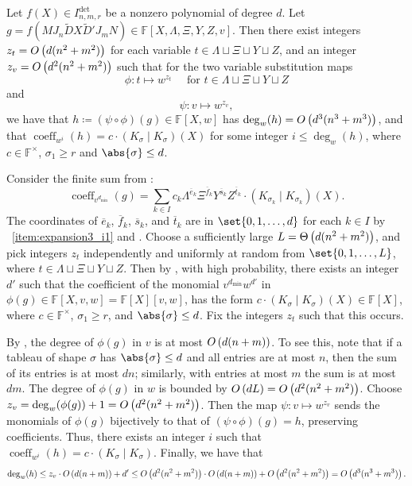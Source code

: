 \documentclass[10pt,a4paper]{amsart}
\DeclareMathOperator{\coeff}{coeff}
\newcommand*\F{\mathbb{F}}
\newcommand*\defeq{\coloneqq}
\newcommand*\bigO[1]{%
    O\kern-0.0pt\left(#1\right)
}
\newcommand*\bigTheta[1]{%
    \Theta\kern-0.0pt\left(#1\right)
}
\begin{document}
\begin{lem}\label{lem:univariate}
Let $f(X) \in I^{\det}_{n, m, r}$ 
be a nonzero polynomial of degree $d$.
Let $g=f(M J_n \widetilde{D} X \widetilde{D}' J_m N) \in \F[X, \Lambda, \Xi, Y, Z, v]$.
Then there exist integers $z_t = \bigO{d(n^2+m^2)}$ for each variable $t\in \Lambda\sqcup\Xi\sqcup Y\sqcup Z$, and an integer $z_v = \bigO{d^2(n^2+m^2)}$ such that for the two variable substitution maps 
\[
    \phi\colon t \mapsto w^{z_t} \quad\text{ for } t\in \Lambda \sqcup \Xi \sqcup Y \sqcup Z
\]
and
\[
    \psi\colon v \mapsto w^{z_v},
\]
we have that $h \defeq (\psi\circ\phi)(g)\in\F[X,w]$ has $\deg_w(h) = \bigO{d^3(n^3+m^3)}$, and that $\coeff_{w^i}(h) = c\cdot (K_\sigma\mid K_\sigma)(X)$ for some integer $i\leq \deg_w(h)$, where $c\in\F^\times$, $\sigma_1\geq r$ and $\abs{\sigma} \leq d$.
\end{lem}
\begin{pf}
Consider the finite sum from :
\[
\coeff_{v^{d_{\min}}}(g)=\sum_{k\in I} c_k \Lambda^{\overline{e}_k}\Xi^{\overline{f}_k}Y^{\overline{s}_k}Z^{\overline{t}_k}\cdot (K_{\sigma_k}\mid K_{\sigma_k})(X).
\]
The coordinates of $\overline{e}_k$, $\overline{f}_k$, $\overline{s}_k$, and $\overline{t}_k$ are in $\set{0,1,\dots,d}$ for each $k \in I$ by ~\eqref{item:expansion3_i1} and .
Choose a sufficiently large $L=\bigTheta{d(n^2+m^2)}$, and pick integers $z_t$ independently and uniformly at random from $ \set{0, 1, \ldots, L}$, where $t\in \Lambda\sqcup\Xi\sqcup Y\sqcup Z$.
Then by , with high probability, there exists an integer $d'$ such that the coefficient of the monomial $v^{d_{\min}}w^{d'}$ in $\phi(g)\in\F[X,v,w]=\F[X][v,w]$, has the form $c\cdot (K_\sigma\mid K_\sigma)(X) \in \F[X]$, where $c\in \F^\times$, $\sigma_1\geq r$, and $\abs{\sigma} \leq d$.
Fix the integers $z_t$ such that this occurs.

By , the degree of $\phi(g)$ in $v$ is at most $\bigO{d(n+m)}$.
To see this, note that if a tableau of shape $\sigma$ has $\abs{\sigma}\leq d$ and all entries are at most $n$, then the sum of its entries is at most $dn$; similarly, with entries at most $m$ the sum is at most $dm$.
The degree of $\phi(g)$ in $w$ is bounded by $\bigO{dL} = \bigO{d^2(n^2+m^2)}$.
Choose $z_v = \deg_w(\phi(g))+1 = \bigO{d^2(n^2+m^2)}$.
Then the map $\psi: v\mapsto w^{z_v}$ sends the monomials of $\phi(g)$ bijectively to that of $(\psi\circ\phi)(g)=h$, preserving coefficients.
Thus, there exists an integer $i$ such that $\coeff_{w^i}(h)=c\cdot (K_\sigma\mid K_\sigma)$.
Finally, we have that
\[
    \deg_w(h) \leq z_v \cdot \bigO{d(n+m)} + d' \leq \bigO{d^2 (n^2 + m^2)} \cdot \bigO{d(n + m)} + \bigO{d^2(n^2+m^2)} = \bigO{d^3(n^3 + m^3)}.
\]
\end{pf}
\end{document}
